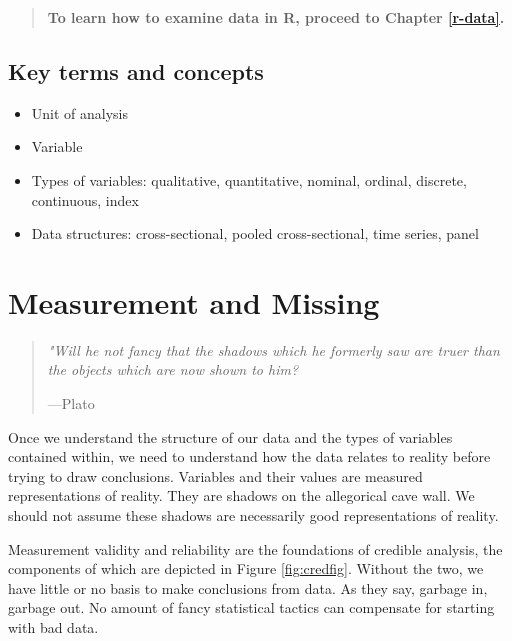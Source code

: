 \documentclass[
]{book}
\providecommand{\tightlist}{%
  \setlength{\itemsep}{0pt}\setlength{\parskip}{0pt}}
\begin{document}
\begin{quote}
\textbf{To learn how to examine data in R, proceed to Chapter \ref{r-data}.}
\end{quote}

\hypertarget{kt1}{%
\section{Key terms and concepts}\label{kt1}}

\begin{itemize}
\tightlist
\item
  Unit of analysis
\item
  Variable
\item
  Types of variables: qualitative, quantitative, nominal, ordinal, discrete, continuous, index
\item
  Data structures: cross-sectional, pooled cross-sectional, time series, panel
\end{itemize}

\hypertarget{measurement-and-missing}{%
\chapter{Measurement and Missing}\label{measurement-and-missing}}

\begin{quote}
\emph{"Will he not fancy that the shadows which he formerly saw are truer than the objects which are now shown to him?}

---Plato
\end{quote}

Once we understand the structure of our data and the types of variables contained within, we need to understand how the data relates to reality before trying to draw conclusions. Variables and their values are measured representations of reality. They are shadows on the allegorical cave wall. We should not assume these shadows are necessarily good representations of reality.

Measurement validity and reliability are the foundations of credible analysis, the components of which are depicted in Figure \ref{fig:credfig}. Without the two, we have little or no basis to make conclusions from data. As they say, garbage in, garbage out. No amount of fancy statistical tactics can compensate for starting with bad data.
\end{document}
